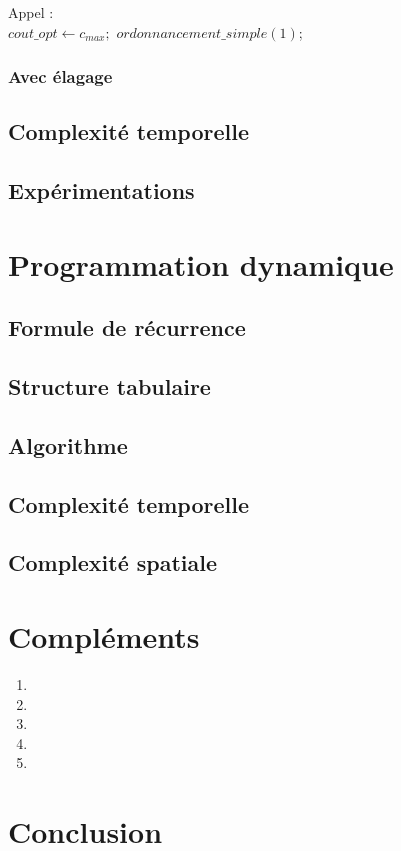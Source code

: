 \documentclass[a4paper, titlepage]{article}
\begin{document}
			\noindent
			Appel :\\
			$cout\_opt \leftarrow c_{max};$ $ordonnancement\_simple(1)$;

		\subsubsection{Avec élagage}

	\subsection{Complexité temporelle}

	\subsection{Expérimentations}

\section{Programmation dynamique}

	\subsection{Formule de récurrence}
	\subsection{Structure tabulaire}
	\subsection{Algorithme}
	\subsection{Complexité temporelle}
	\subsection{Complexité spatiale}

\section{Compléments}
\begin{enumerate}
\item
\item
\item
\item
\item
\end{enumerate}

\section{Conclusion}
\end{document}
